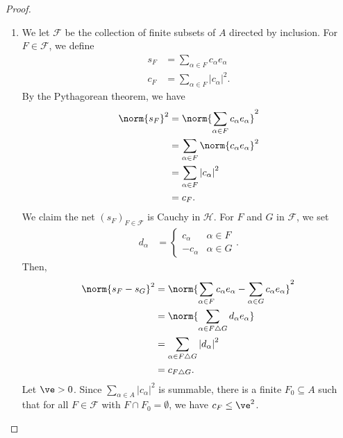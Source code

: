 \documentclass[10pt]{mypackage}
\begin{document}
\begin{proof}\hfill
  \begin{enumerate}[(1)]
    \item We let $\mathcal{F}$ be the collection of finite subsets of $A$ directed by inclusion. For $F\in \mathcal{F}$, we define
      \begin{align*}
        s_F &= \sum_{\alpha \in F}c_{\alpha}e_{\alpha}\\
        c_{F} &= \sum_{\alpha \in F}\left\vert c_{\alpha} \right\vert^2.
      \end{align*}
      By the Pythagorean theorem, we have
      \begin{align*}
        \norm{s_F}^2 &= \norm{\sum_{\alpha \in F}c_{\alpha}e_{\alpha}}^2\\
                     &= \sum_{\alpha \in F}\norm{c_{\alpha}e_{\alpha}}^2\\
                     &= \sum_{\alpha \in F}\left\vert c_{\alpha} \right\vert^2\\
                     &= c_F.
      \end{align*}
      We claim the net $\left(s_{F}\right)_{F\in \mathcal{F}}$ is Cauchy in $\mathcal{H}$. For $F$ and $G$ in $\mathcal{F}$, we set
      \begin{align*}
        d_{\alpha} &= \begin{cases}
          c_{\alpha} & \alpha\in F\\
          -c_{\alpha} & \alpha \in G
        \end{cases}.
      \end{align*}
      Then,
      \begin{align*}
        \norm{s_{F} - s_{G}}^2 &= \norm{\sum_{\alpha \in F}c_{\alpha}e_{\alpha} - \sum_{\alpha \in G}c_{\alpha}e_{\alpha}}^2\\
                               &= \norm{\sum_{\alpha \in F\triangle G}d_{\alpha}e_{\alpha}}\\
                               &= \sum_{\alpha \in F\triangle G}\left\vert d_{\alpha} \right\vert^2\\
                               &= c_{F\triangle G}.
      \end{align*}
      Let $\ve > 0$. Since $\sum_{\alpha \in A}\left\vert c_{\alpha} \right\vert^2$ is summable, there is a finite $F_0\subseteq A$ such that for all $F\in \mathcal{F}$ with $F\cap F_0 = \emptyset$, we have $c_F\leq \ve^2$.\newline


\end{enumerate}
\end{proof}
\end{document}
